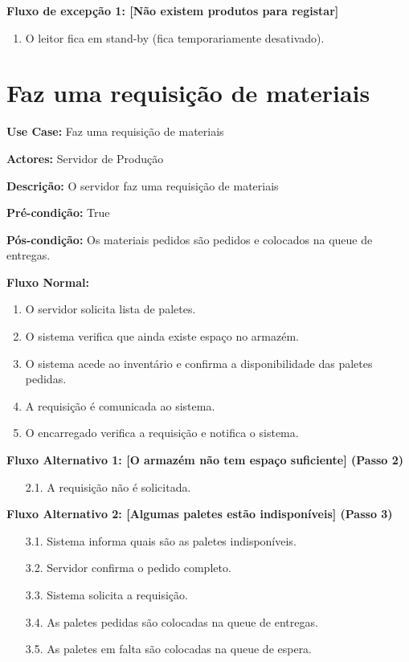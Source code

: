 \documentclass[a4paper]{report}
\begin{document}
\textbf{Fluxo de excepção 1: [Não existem produtos para registar]} 

\begin{enumerate}

    \item  O leitor fica em stand-by (fica temporariamente desativado).
\end{enumerate}


\newpage

\section{Faz uma requisição de materiais}

\textbf{Use Case:} Faz uma requisição de materiais

\textbf{Actores:} Servidor de Produção

\textbf{Descrição:} O servidor faz uma requisição de materiais  

\textbf{Pré-condição:} True

\textbf{Pós-condição:} Os materiais pedidos são pedidos e colocados na queue de entregas.

\textbf{Fluxo Normal:} 
\begin{enumerate}
    \item O servidor solicita lista de paletes.
    \item O sistema verifica que ainda existe espaço no armazém.
    \item O sistema acede ao inventário e confirma a disponibilidade das paletes pedidas.
    \item A requisição é comunicada ao sistema.
    \item O encarregado verifica a requisição e notifica o sistema. 
\end{enumerate}

\textbf{Fluxo Alternativo 1: [O armazém não tem espaço suficiente] (Passo 2)}
\begin{enumerate}
    \item [2.1.] A requisição não é solicitada.
\end{enumerate}
     
\textbf{Fluxo Alternativo 2: [Algumas paletes estão indisponíveis] (Passo 3)}
\begin{enumerate}
    \item [3.1.] Sistema informa quais são as paletes indisponíveis.
    \item [3.2.] Servidor confirma o pedido completo.
    \item [3.3.] Sistema solicita a requisição.
    \item [3.4.] As paletes pedidas são colocadas na queue de entregas.
    \item [3.5.] As paletes em falta são colocadas na queue de espera.
\end{enumerate}
\end{document}
